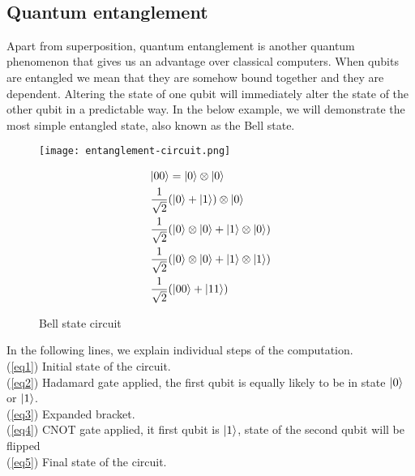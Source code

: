 \\
\subsection{Quantum entanglement}
Apart from superposition, quantum entanglement is another quantum phenomenon that gives us an advantage over classical computers. When qubits are entangled we mean that they are somehow bound together and they are dependent. Altering the state of one qubit will immediately alter the state of the other qubit in a predictable way. In the below example, we will demonstrate the most simple entangled state, also known as the Bell state.

\begin{figure}[H]
\begin{minipage}{.35\textwidth}
    \texttt{[image: entanglement-circuit.png]}
    \caption{Bell state circuit}

\end{minipage}
\hfill
\begin{minipage}{.50\textwidth}
  \begin{align} 
             &\lvert00\rangle = \lvert0\rangle \otimes \lvert0\rangle \label{eq1} \\
             &\frac{1}{\sqrt{2}}(\lvert0\rangle + \lvert1\rangle) \otimes \lvert0\rangle \label{eq2}\\
             &\frac{1}{\sqrt{2}}(\lvert0\rangle \otimes \lvert0\rangle + \lvert1\rangle \otimes \lvert0\rangle) \label{eq3} \\
             &\frac{1}{\sqrt{2}}(\lvert0\rangle \otimes \lvert0\rangle + \lvert1\rangle \otimes \lvert1\rangle) \label{eq4}\\
             &\frac{1}{\sqrt{2}}(\lvert00\rangle + \lvert11\rangle) \label{eq5}
  \end{align}
\end{minipage}
\end{figure}

\noindent In the following lines, we explain individual steps of the computation.\\
\noindent (\ref{eq1}) Initial state of the circuit.\\
(\ref{eq2}) Hadamard gate applied, the first qubit is equally likely to be in state $\lvert0\rangle$ or $\lvert1\rangle$.\\
(\ref{eq3}) Expanded bracket.\\
(\ref{eq4}) CNOT gate applied, it first qubit is $\lvert1\rangle$, state of the second qubit will be flipped\\
(\ref{eq5}) Final state of the circuit.\\

